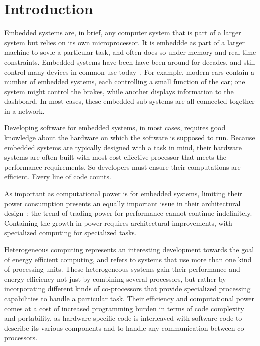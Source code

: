 \documentclass[../main.tex]{subfiles}
\begin{document}
\chapter{Introduction}
\label{intro}

Embedded systems are, in brief, any computer system that is part of a larger system but relies on its own microprocessor. It is embeddde as part of a larger machine to sovle a particular task, and often does so under memory and real-time constraints. Embedded systems have been have been around for decades, and still control many devices in common use today~\cite{barr2006}. For example, modern cars contain a number of embedded systems, each controlling a small function of the car; one system might control the brakes, while another displays information to the dashboard. In most cases, these embedded sub-systems are all connected together in a network. 

Developing software for embedded systems, in most cases, requires good knowledge about the hardware on which the software is supposed to run. Because embedded systems are typically designed with a task in mind, their hardware systems are often built with most cost-effective processor that meets the performance requirements. So developers must ensure their computations are efficient. Every line of code counts.

As important as computational power is for embedded systems, limiting their power consumption presents an equally important issue in their architectural design~\cite{mudge2001}; the trend of trading power for performance cannot continue indefinitely. Containing the growth in power requires architectural improvements, with specialized computing for specialized tasks.



Heterogeneous computing represents an interesting development towards the goal of energy efficient computing, and refers to systems that use more than one kind of processing units. These heterogeneous systems gain their performance and energy efficiency not just by combining several processors, but rather by incorporating different kinds of co-processors that provide specialized processing capabilities to handle a particular task. Their efficiency and computational power comes at a cost of increased programming burden in terms of code complexity and portability, as hardware specific code is interleaved with software code to describe its various components and to handle any communication between co-processors.
\end{document}
